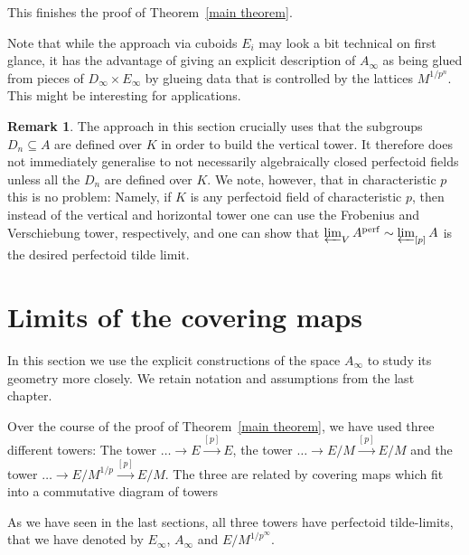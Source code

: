 \documentclass[10pt,oneside]{amsart}
\theoremstyle{definition}
\newtheorem{remark}[theorem]{Remark}
\begin{document}
	This finishes the proof of Theorem~\ref{main theorem}.
	
	Note that while the approach via cuboids $E_i$ may look a bit technical on first glance, it has the advantage of giving an explicit description of $A_\infty$ as being glued from pieces of $D_\infty\times E_\infty$ by glueing data that is controlled by the lattices $M^{1/p^n}$. This might be interesting for applications.
	
	\begin{remark}
		The approach in this section crucially uses that the subgroups $D_n\subseteq A$ are defined over $K$ in order to build the vertical tower. It therefore does not immediately generalise to not necessarily algebraically closed perfectoid fields unless all the $D_n$ are defined over $K$. We note, however, that in characteristic $p$ this is no problem: Namely, if $K$ is any perfectoid field of characteristic $p$, then instead of the vertical and horizontal tower one can use the Frobenius and Verschiebung tower, respectively, and one can show that $\varprojlim_VA^{\operatorname{perf}}\sim \varprojlim_{[p]}A$ is the desired perfectoid tilde limit.
	\end{remark}
	
	
	\section{Limits of the covering maps}
	In this section we use the explicit constructions of the space $A_\infty$ to study its geometry more closely. We retain notation and assumptions from the last chapter.
	
	Over the course of the proof of Theorem~\ref{main theorem}, we have used three different towers: The tower $\dots \rightarrow E\xrightarrow{[p]} E$, the tower $\dots \rightarrow E/M \xrightarrow{[p]} E/M$ and the tower $\dots \rightarrow E/M^{1/p} \xrightarrow{[p]} E/M$. The three are related by covering maps which fit into a commutative diagram of towers
	\begin{center}
	\end{center}
	As we have seen in the last sections, all three towers have perfectoid tilde-limits, that we have denoted by $E_\infty$, $A_\infty$ and $E/M^{1/p^\infty}$.
	
\end{document}
